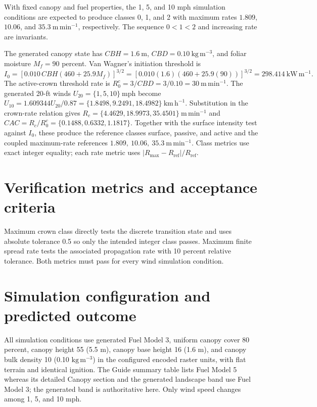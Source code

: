 With fixed canopy and fuel properties, the 1, 5, and 10 mph simulation conditions are expected to produce classes 0, 1, and 2 with maximum rates \(1.809\), \(10.06\), and \(35.3~\mathrm{m\,min^{-1}}\), respectively. The sequence \(0<1<2\) and increasing rate are invariants.

The generated canopy state has \(CBH=1.6~\mathrm{m}\),
\(CBD=0.10~\mathrm{kg\,m^{-3}}\), and foliar moisture \(M_f=90\) percent.
Van Wagner's initiation threshold is
\[
 I_0=\left[0.010\,CBH(460+25.9M_f)\right]^{3/2}
 =\left[0.010(1.6)(460+25.9(90))\right]^{3/2}
 =298.414~\mathrm{kW\,m^{-1}}.
\]
The active-crown threshold rate is \(R_0^{c}=3/CBD=3/0.10
=30~\mathrm{m\,min^{-1}}\).  The generated 20-ft winds
\(U_{20}=\{1,5,10\}~\mathrm{mph}\) become
\(U_{10}=1.609344U_{20}/0.87=\{1.8498,9.2491,18.4982\}~\mathrm{km\,h^{-1}}\).
Substitution in the crown-rate relation gives
\(R_c=\{4.4629,18.9973,35.4501\}~\mathrm{m\,min^{-1}}\) and
\(CAC=R_c/R_0^c=\{0.1488,0.6332,1.1817\}\).  Together with the surface
intensity test against \(I_0\), these produce the reference classes
surface, passive, and active and the coupled maximum-rate references
\(1.809,\ 10.06,\ 35.3~\mathrm{m\,min^{-1}}\).  Class metrics use exact
integer equality; each rate metric uses
\(|R_{\max}-R_{\mathrm{ref}}|/R_{\mathrm{ref}}\).

\section{Verification metrics and acceptance criteria}

Maximum crown class directly tests the discrete transition state and uses absolute tolerance 0.5 so only the intended integer class passes. Maximum finite spread rate tests the associated propagation rate with 10 percent relative tolerance. Both metrics must pass for every wind simulation condition.

\section{Simulation configuration and predicted outcome}

All simulation conditions use generated Fuel Model 3, uniform canopy cover 80 percent, canopy height 55 (5.5 m), canopy base height 16 (1.6 m), and canopy bulk density 10 (0.10 \(\mathrm{kg\,m^{-3}}\)) in the configured encoded raster units, with flat terrain and identical ignition. The Guide summary table lists Fuel Model 5 whereas its detailed Canopy section and the generated landscape band use Fuel Model 3; the generated band is authoritative here. Only wind speed changes among 1, 5, and 10 mph.

